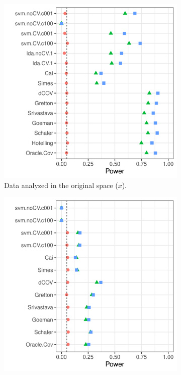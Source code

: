 \documentclass[]{bio}
\begin{document}
\begin{figure}[th]
	\centering
	\begin{subfigure}[t]{.45\columnwidth}
		\centering
		\includegraphics[width=1\columnwidth]{"art/file41"}
		\caption{Data analyzed in the original space ($x$).}
		\label{fig:interactions-in-original-space}
	\end{subfigure}
	\begin{subfigure}[t]{.45\columnwidth}
		\centering
		\includegraphics[width=1\columnwidth]{"art/file45"}

\end{subfigure}
\end{figure}
\end{document}
